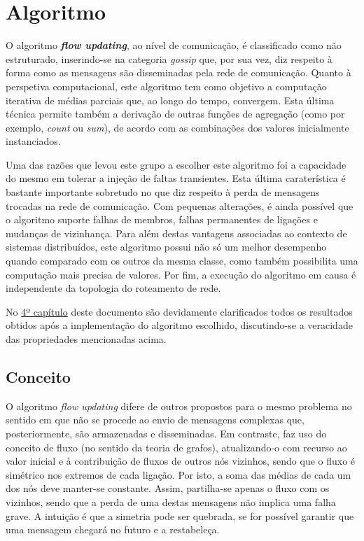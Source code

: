 \documentclass[a4paper]{report}
\begin{document}
{\let\clearpage\relax \chapter{Algoritmo} \label{ch:Algorithm}}
\large{
	O algoritmo \textbf{\textit{flow updating}}, ao nível de comunicação, é classificado como não estruturado, inserindo-se na categoria \textit{gossip} que, por sua vez, diz respeito à forma como as mensagens são disseminadas pela rede de comunicação.
	Quanto à perspetiva computacional, este algoritmo tem como objetivo a computação iterativa de médias parciais que, ao longo do tempo, convergem.
	Esta última técnica permite também a derivação de outras funções de agregação (como por exemplo, \textit{count} ou \textit{sum}), de acordo com as combinações dos valores inicialmente instanciados.

	Uma das razões que levou este grupo a escolher este algoritmo foi a capacidade do mesmo em tolerar a injeção de faltas transientes. 
	Esta última caraterística é bastante importante sobretudo no que diz respeito à perda de mensagens trocadas na rede de comunicação.
	Com pequenas alterações, é ainda possível que o algoritmo suporte falhas de membros, falhas permanentes de ligações e mudanças de vizinhança.
	Para além destas vantagens associadas ao contexto de sistemas distribuídos, este algoritmo possui não só um melhor desempenho quando comparado com os outros da mesma classe, como também possibilita uma computação mais precisa de valores.
	Por fim, a execução do algoritmo em causa é independente da topologia do roteamento de rede.

	No \hyperref[ch:Analysis of results]{4º capítulo} deste documento são devidamente clarificados todos os resultados obtidos após a implementação do algoritmo escolhido, discutindo-se a veracidade das propriedades mencionadas acima.

	\section{Conceito} \label{sec:Concept}
	O algoritmo \textit{flow updating} difere de outros propostos para o mesmo problema no sentido em que não se procede ao envio de mensagens complexas que, posteriormente, são armazenadas e disseminadas.
	Em contraste, faz uso do conceito de fluxo (no sentido da teoria de grafos), atualizando-o com recurso ao valor inicial e à contribuição de fluxos de outros nós vizinhos, sendo que o fluxo é simétrico nos extremos de cada ligação. Por isto, a soma das médias de cada um dos nós deve manter-se constante.
	Assim, partilha-se apenas o fluxo com os vizinhos, sendo que a perda de uma destas mensagens não implica uma falha grave.
	A intuição é que a simetria pode ser quebrada, se for possível garantir que uma mensagem chegará no futuro e a restabeleça.

}
\end{document}
